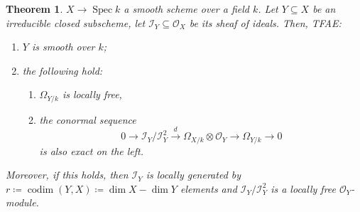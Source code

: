 \documentclass[12pt]{article}
\DeclareMathOperator{\Spec}{Spec}
\DeclareMathOperator{\codim}{codim}
\newtheorem*{theorem}{Theorem}
\theoremstyle{definition}
\theoremstyle{remark}
\newtheorem*{comment}{Comment}
\begin{document}
\begin{theorem}
$X\rightarrow\Spec k$ a smooth scheme over a field $k$. Let $Y\subseteq X$ be an irreducible closed subscheme, let $\mathcal{I}_Y\subseteq\mathcal{O}_X$ be its sheaf of ideals. Then, TFAE:
\begin{enumerate}[label=\arabic*)]
\item $Y$ is smooth over $k$;
\item\label{sub_smooth} the following hold:
\begin{enumerate}[label=\alph*)]
\item\label{sub_free} $\Omega_{Y/k}$ is locally free,
\item\label{sub_cunumi} the conormal sequence
\[0\longrightarrow\mathcal{I}_Y/\mathcal{I}_Y^2\overset{d}{\longrightarrow}\Omega_{X/k}\otimes\mathcal{O}_Y\longrightarrow\Omega_{Y/k}\longrightarrow0\]
is also exact on the left.
\end{enumerate}
\end{enumerate}

Moreover, if this holds, then $\mathcal{I}_Y$ is locally generated by $r\coloneqq\codim(Y,X)\coloneqq\dim X-\dim Y$ elements and $\mathcal{I}_Y/\mathcal{I}_Y^2$ is a locally free $\mathcal{O}_Y$-module.
\end{theorem}

\begin{comment}
Intuitively, this means that a smooth subvariety of codimension $r$ can be locally defined by $r$ equations.
\end{comment}
\end{document}
